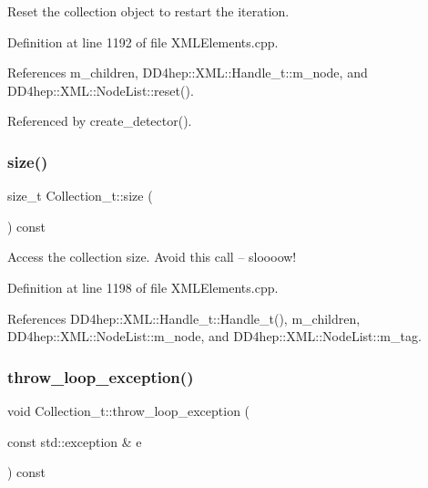 Reset the collection object to restart the iteration. 



Definition at line 1192 of file X\+M\+L\+Elements.\+cpp.



References m\+\_\+children, D\+D4hep\+::\+X\+M\+L\+::\+Handle\+\_\+t\+::m\+\_\+node, and D\+D4hep\+::\+X\+M\+L\+::\+Node\+List\+::reset().



Referenced by create\+\_\+detector().

\hypertarget{class_d_d4hep_1_1_x_m_l_1_1_collection__t_add04429f77237942654dcab1852b6655}{}\label{class_d_d4hep_1_1_x_m_l_1_1_collection__t_add04429f77237942654dcab1852b6655} 
\subsubsection{\texorpdfstring{size()}{size()}}
{\footnotesize\ttfamily size\+\_\+t Collection\+\_\+t\+::size (\begin{DoxyParamCaption}{ }\end{DoxyParamCaption}) const}



Access the collection size. Avoid this call -- sloooow! 



Definition at line 1198 of file X\+M\+L\+Elements.\+cpp.



References D\+D4hep\+::\+X\+M\+L\+::\+Handle\+\_\+t\+::\+Handle\+\_\+t(), m\+\_\+children, D\+D4hep\+::\+X\+M\+L\+::\+Node\+List\+::m\+\_\+node, and D\+D4hep\+::\+X\+M\+L\+::\+Node\+List\+::m\+\_\+tag.

\hypertarget{class_d_d4hep_1_1_x_m_l_1_1_collection__t_ab3cc2f0d13537260157a36ace7ed0f0d}{}\label{class_d_d4hep_1_1_x_m_l_1_1_collection__t_ab3cc2f0d13537260157a36ace7ed0f0d} 
\subsubsection{\texorpdfstring{throw\+\_\+loop\+\_\+exception()}{throw\_loop\_exception()}}
{\footnotesize\ttfamily void Collection\+\_\+t\+::throw\+\_\+loop\+\_\+exception (\begin{DoxyParamCaption}\item[{const std\+::exception \&}]{e }\end{DoxyParamCaption}) const}



